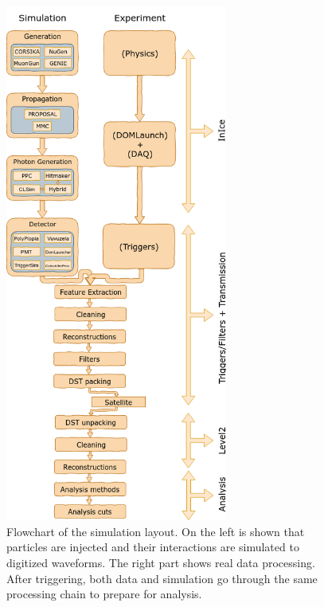 \begin{figure}
\centering
\includegraphics[width=0.65\textwidth]{chapter6/img/flowchart_extended.png}
\caption{Flowchart of the simulation layout. On the left is shown that particles are injected and their interactions are simulated to digitized waveforms. The right part shows real data processing. After triggering, both data and simulation go through the same processing chain to prepare for analysis.}
\label{fig:flowchart}
\end{figure}

